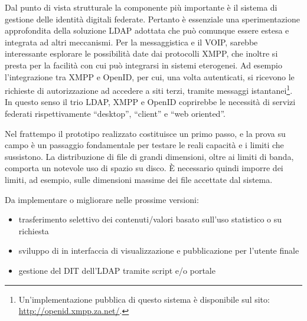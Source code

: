 Dal punto di vista strutturale la componente più importante è il
sistema di gestione delle identità digitali federate. Pertanto è
essenziale una sperimentazione approfondita della soluzione LDAP
adottata che può comunque essere estesa e integrata ad altri
meccanismi. Per la messaggistica e il VOIP, sarebbe interessante
esplorare le possibilità date dai protocolli XMPP, che inoltre si
presta per la facilità con cui può integrarsi in sistemi
eterogenei. Ad esempio l'integrazione tra XMPP e OpenID, per cui, una
volta autenticati, si ricevono le richieste di autorizzazione ad
accedere a siti terzi, tramite messaggi
istantanei\footnote{Un'implementazione pubblica di questo sistema è
  disponibile sul sito: \url{http://openid.xmpp.za.net/}.}. In questo
senso il trio LDAP, XMPP e OpenID coprirebbe le necessità di servizi
federati rispettivamente ``desktop'', ``client'' e ``web oriented''.

Nel frattempo il prototipo realizzato costituisce un primo passo, e la
prova su campo è un passaggio fondamentale per testare le reali
capacità e i limiti che sussistono. La distribuzione di file di grandi
dimensioni, oltre ai limiti di banda, comporta un notevole uso di
spazio su disco. È necessario quindi imporre dei limiti, ad esempio,
sulle dimensioni massime dei file accettate dal sistema.

Da implementare o migliorare nelle prossime versioni:
\begin{itemize}
\item trasferimento selettivo dei contenuti/valori basato sull'uso
  statistico o su richiesta
\item sviluppo di in interfaccia di visualizzazione e pubblicazione
  per l'utente finale
\item gestione del DIT dell'LDAP tramite script e/o portale
\end{itemize}

